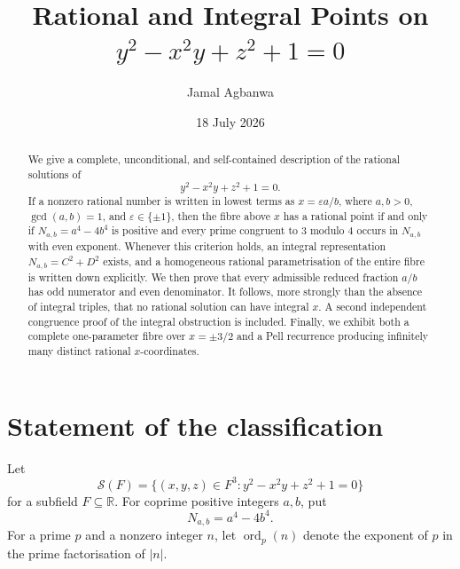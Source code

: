 \documentclass[11pt]{article}
\title{Rational and Integral Points on\\[3pt]
\texorpdfstring{$y^{2}-x^{2}y+z^{2}+1=0$}{y^2 - x^2 y + z^2 + 1 = 0}}
\author{Jamal Agbanwa}
\date{18 July 2026}
\numberwithin{equation}{section}
\theoremstyle{definition}
\theoremstyle{remark}
\newcommand{\ord}{\operatorname{ord}}
\newcommand{\eps}{\varepsilon}
\begin{document}
\maketitle

\begin{abstract}
We give a complete, unconditional, and self-contained description of the
rational solutions of
\[
 y^{2}-x^{2}y+z^{2}+1=0.
\]
If a nonzero rational number is written in lowest terms as
$x=\eps a/b$, where $a,b>0$, $\gcd(a,b)=1$, and $\eps\in\{\pm1\}$,
then the fibre above $x$ has a rational point if and only if
$N_{a,b}=a^{4}-4b^{4}$ is positive and every prime congruent to $3$
modulo $4$ occurs in $N_{a,b}$ with even exponent.  Whenever this
criterion holds, an integral representation $N_{a,b}=C^{2}+D^{2}$
exists, and a homogeneous rational parametrisation of the entire fibre
is written down explicitly.  We then prove that every admissible
reduced fraction $a/b$ has odd numerator and even denominator.  It
follows, more strongly than the absence of integral triples, that no
rational solution can have integral $x$.  A second independent
congruence proof of the integral obstruction is included.  Finally, we
exhibit both a complete one-parameter fibre over $x=\pm3/2$ and a Pell
recurrence producing infinitely many distinct rational
$x$-coordinates.
\end{abstract}

\section{Statement of the classification}

Let
\[
 \mathcal S(F)=\bigl\{(x,y,z)\in F^{3}:
 y^{2}-x^{2}y+z^{2}+1=0\bigr\}
\]
for a subfield $F\subseteq\mathbb R$.  For coprime positive integers
$a,b$, put
\[
 N_{a,b}=a^{4}-4b^{4}.
\]
For a prime $p$ and a nonzero integer $n$, let $\ord_{p}(n)$ denote the
exponent of $p$ in the prime factorisation of $|n|$.
\end{document}
